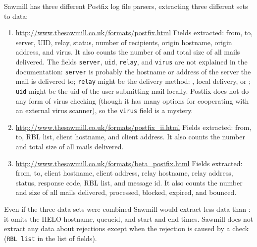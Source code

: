Sawmill has three different Postfix log file parsers, extracting three
different sets to data:

\begin{enumerate}

    \item \url{http://www.thesawmill.co.uk/formats/postfix.html} \newline{}
        Fields extracted: from, to, server, UID, relay, status, number of
        recipients, origin hostname, origin  address, and
        virus.  It also counts the number of and total size of all mails
        delivered.  The fields \texttt{server}, \texttt{uid},
        \texttt{relay}, and \texttt{virus} are not explained in the
        documentation: \texttt{server} is probably the hostname or
         address of the server the mail is delivered to;
        \texttt{relay} might be the delivery method: , local
        delivery, or ; \texttt{uid} might be the uid of the
        user submitting mail locally.  Postfix does not do any form of
        virus checking (though it has many options for cooperating with an
        external virus scanner), so the \texttt{virus} field is a mystery.

    \item \url{http://www.thesawmill.co.uk/formats/postfix_ii.html}
        \newline{} Fields extracted: from, to, RBL list, client hostname,
        and client  address.  It also counts the number and
        total size of all mails delivered.  

    \item \url{http://www.thesawmill.co.uk/formats/beta_postfix.html}
        \newline{} Fields extracted: from, to, client hostname, client
         address, relay hostname, relay  address,
        status, response code, RBL list, and message id.  It also counts
        the number and size of all mails delivered, processed, blocked,
        expired, and bounced.

\end{enumerate}

Even if the three data sets were combined Sawmill would extract less data
than \parsername{}: it omits the HELO hostname, queueid, and start and end
times.  Sawmill does not extract any data about rejections except when the
rejection is caused by a  check (\texttt{RBL list} in the
list of fields).

